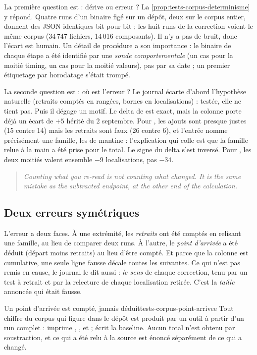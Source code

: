 La première question est : dérive ou erreur ? La \cref{prop:tests-corpus-determinisme} y répond. Quatre runs d'un binaire figé sur un dépôt, deux sur le corpus entier, donnent des JSON identiques bit pour bit ; les huit runs de la correction voient le même corpus (34\,747 fichiers, 14\,016 composants). Il n'y a pas de bruit, donc l'écart est humain. Un détail de procédure a son importance : le binaire de chaque étape a été identifié par une \emph{sonde comportementale} (un cas  pour la moitié timing, un cas  pour la moitié valeurs), pas par sa date ; un premier étiquetage par horodatage s'était trompé.

La seconde question est : où est l'erreur ? Le journal écarte d'abord l'hypothèse naturelle (retraits comptés en rangées, bornes en localisations) : testée, elle ne tient pas. Puis il dégage un motif. Le delta de  est exact, mais la colonne porte déjà un écart de $+5$ hérité du 2 septembre. Pour , les ajouts sont presque justes (15 contre 14) mais les retraits sont faux (26 contre 6), et l'entrée nomme précisément une famille, les  de mantine : l'explication qui colle est que la famille relue à la main a été prise pour le total. Le signe du delta s'est inversé. Pour , les deux moitiés valent ensemble $-9$ localisations, pas $-34$.

\begin{quote}\itshape
Counting what you re-read is not counting what changed. It is the same mistake as the subtracted endpoint, at the other end of the calculation.
\end{quote}

\subsection{Deux erreurs symétriques}

L'erreur a deux faces. À une extrémité, les \emph{retraits} ont été comptés en relisant une famille, au lieu de comparer deux runs. À l'autre, le \emph{point d'arrivée} a été déduit (départ moins retraits) au lieu d'être compté. Et parce que la colonne est cumulative, une seule ligne fausse décale toutes les suivantes. Ce qui n'est pas remis en cause, le journal le dit aussi : \emph{le sens} de chaque correction, tenu par un test à retrait et par la relecture de chaque localisation retirée. C'est la \emph{taille} annoncée qui était fausse.

\begin{invariant}{Un point d'arrivée est compté, jamais déduit}{tests-corpus-point-arrivee}
Tout chiffre du corpus qui figure dans le dépôt est produit par un outil à partir d'un run complet :  imprime , ,  et  ;  écrit la baseline. Aucun total n'est obtenu par soustraction, et ce qui a été relu à la source est énoncé séparément de ce qui a changé.
\end{invariant}

